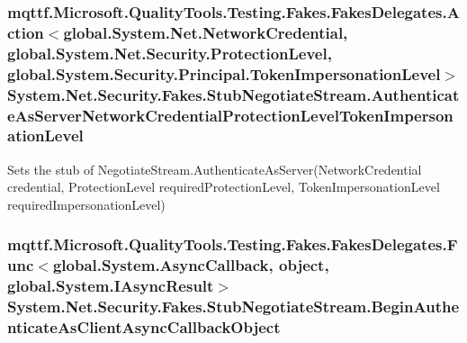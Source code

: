 \hypertarget{class_system_1_1_net_1_1_security_1_1_fakes_1_1_stub_negotiate_stream_ab9ca1f1fe46cc4bf31ab8766d2427033}{
\subsubsection[{Authenticate\-As\-Server\-Network\-Credential\-Protection\-Level\-Token\-Impersonation\-Level}]{\setlength{\rightskip}{0pt plus 5cm}mqttf.\-Microsoft.\-Quality\-Tools.\-Testing.\-Fakes.\-Fakes\-Delegates.\-Action$<$global.\-System.\-Net.\-Network\-Credential, global.\-System.\-Net.\-Security.\-Protection\-Level, global.\-System.\-Security.\-Principal.\-Token\-Impersonation\-Level$>$ System.\-Net.\-Security.\-Fakes.\-Stub\-Negotiate\-Stream.\-Authenticate\-As\-Server\-Network\-Credential\-Protection\-Level\-Token\-Impersonation\-Level}}\label{class_system_1_1_net_1_1_security_1_1_fakes_1_1_stub_negotiate_stream_ab9ca1f1fe46cc4bf31ab8766d2427033}


Sets the stub of Negotiate\-Stream.\-Authenticate\-As\-Server(\-Network\-Credential credential, Protection\-Level required\-Protection\-Level, Token\-Impersonation\-Level required\-Impersonation\-Level)

\hypertarget{class_system_1_1_net_1_1_security_1_1_fakes_1_1_stub_negotiate_stream_ac82c906590aba07760e8d9de8af8f5cf}{
\subsubsection[{Begin\-Authenticate\-As\-Client\-Async\-Callback\-Object}]{\setlength{\rightskip}{0pt plus 5cm}mqttf.\-Microsoft.\-Quality\-Tools.\-Testing.\-Fakes.\-Fakes\-Delegates.\-Func$<$global.\-System.\-Async\-Callback, object, global.\-System.\-I\-Async\-Result$>$ System.\-Net.\-Security.\-Fakes.\-Stub\-Negotiate\-Stream.\-Begin\-Authenticate\-As\-Client\-Async\-Callback\-Object}}\label{class_system_1_1_net_1_1_security_1_1_fakes_1_1_stub_negotiate_stream_ac82c906590aba07760e8d9de8af8f5cf}


